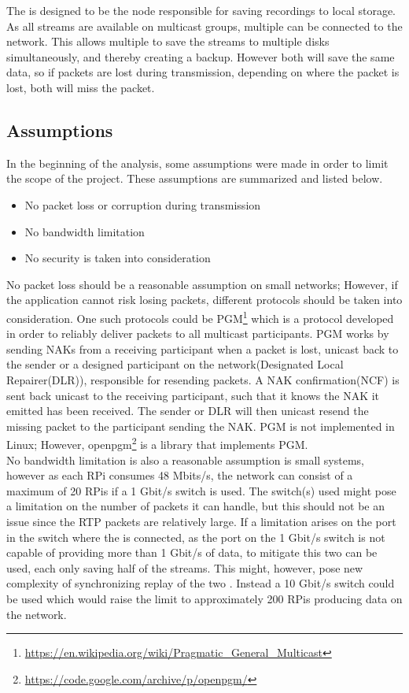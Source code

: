 The \hist{} is designed to be the node responsible for saving recordings to local storage. As all streams are available on multicast groups, multiple  can be connected to the network. This allows multiple  to save the streams to multiple disks simultaneously, and thereby creating a backup. However both  will save the same data, so if packets are lost during transmission, depending on where the packet is lost, both  will miss the packet.\\

\subsection{Assumptions}
\noindent{}In the beginning of the analysis, some assumptions were made in order to limit the scope of the project. These assumptions are summarized and listed below.
\begin{itemize}
	\item No packet loss or corruption during transmission
	\item No bandwidth limitation
	\item No security is taken into consideration
\end{itemize}

No packet loss should be a reasonable assumption on small networks; However, if the application cannot risk losing packets, different protocols should be taken into consideration.
One such protocols could be \ac{PGM}\footnote{\url{https://en.wikipedia.org/wiki/Pragmatic\_General\_Multicast}} which is a protocol developed in order to reliably deliver packets to all multicast participants.
PGM works by sending NAKs from a receiving participant when a packet is lost, unicast back to the sender or a designed participant on the network(Designated Local Repairer(DLR)), responsible for resending packets. A NAK confirmation(NCF) is sent back unicast to the receiving participant, such that it knows the NAK it emitted has been received. The sender or DLR will then unicast resend the missing packet to the participant sending the NAK. PGM is not implemented in Linux; However, openpgm\footnote{\url{https://code.google.com/archive/p/openpgm/}} is a library that implements PGM.\\

\noindent{}No bandwidth limitation is also a reasonable assumption is small systems, however as each RPi consumes 48 Mbits/s, the network can consist of a maximum of 20 RPis if a 1 Gbit/s switch is used. The switch(s) used might pose a limitation on the number of packets it can handle, but this should not be an issue since the RTP packets are relatively large.  If a limitation arises on the port in the switch where the \hist{} is connected, as the port on the 1 Gbit/s switch is not capable of providing more than 1 Gbit/s of data, to mitigate this two  can be used, each only saving half of the streams. This might, however, pose new complexity of synchronizing replay of the two . Instead a 10 Gbit/s switch could be used which would raise the limit to approximately 200 RPis producing data on the network.\\

